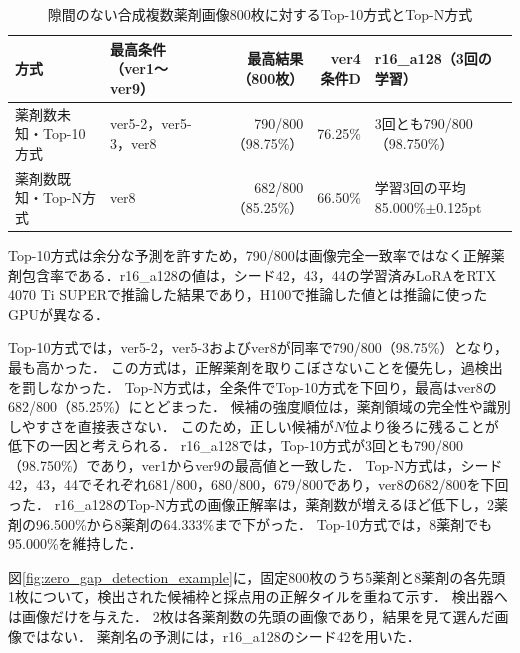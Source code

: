 \documentclass[uplatex,dvipdfmx]{jsarticle}
\begin{document}
\begin{table}[htbp]
  \centering
  \renewcommand{\arraystretch}{1.5}
  \caption{隙間のない合成複数薬剤画像800枚に対するTop-10方式とTop-N方式}
  \label{tab:zero_gap_top10_summary}
  \small
  \setlength{\tabcolsep}{3pt}
  \begin{tabular}{|p{2.6cm}|p{2.1cm}|r|r|>{\raggedright\arraybackslash}p{4.7cm}|}
    \hline
    方式 & \shortstack[l]{最高条件\\（ver1〜ver9）} & \shortstack{最高結果\\（800枚）} & \shortstack{ver4\\条件D} & r16\_a128（3回の学習） \\ \hline
    薬剤数未知・Top-10方式 & ver5-2，ver5-3，ver8 & 790/800（98.75\%） & 76.25\% & 3回とも790/800（98.750\%） \\ \hline
    薬剤数既知・Top-N方式 & ver8 & 682/800（85.25\%） & 66.50\% & \shortstack[l]{学習3回の平均\\85.000\%$\pm$0.125pt} \\ \hline
  \end{tabular}

  \vspace{1mm}
  {\scriptsize Top-10方式は余分な予測を許すため，790/800は画像完全一致率ではなく正解薬剤包含率である．r16\_a128の値は，シード42，43，44の学習済みLoRAをRTX 4070 Ti SUPERで推論した結果であり，H100で推論した値とは推論に使ったGPUが異なる．}
\end{table}

Top-10方式では，ver5-2，ver5-3およびver8が同率で790/800（98.75\%）となり，最も高かった．
この方式は，正解薬剤を取りこぼさないことを優先し，過検出を罰しなかった．
Top-N方式は，全条件でTop-10方式を下回り，最高はver8の682/800（85.25\%）にとどまった．
候補の強度順位は，薬剤領域の完全性や識別しやすさを直接表さない．
このため，正しい候補が$N$位より後ろに残ることが低下の一因と考えられる．
r16\_a128では，Top-10方式が3回とも790/800（98.750\%）であり，ver1からver9の最高値と一致した．
Top-N方式は，シード42，43，44でそれぞれ681/800，680/800，679/800であり，ver8の682/800を下回った．
r16\_a128のTop-N方式の画像正解率は，薬剤数が増えるほど低下し，2薬剤の96.500\%から8薬剤の64.333\%まで下がった．
Top-10方式では，8薬剤でも95.000\%を維持した．

図\ref{fig:zero_gap_detection_example}に，固定800枚のうち5薬剤と8薬剤の各先頭1枚について，検出された候補枠と採点用の正解タイルを重ねて示す．
検出器へは画像だけを与えた．
2枚は各薬剤数の先頭の画像であり，結果を見て選んだ画像ではない．
薬剤名の予測には，r16\_a128のシード42を用いた．
\end{document}

